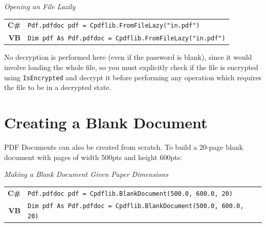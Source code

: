 \documentclass[a4paper]{memoir}
\begin{document}
\begin{framed}
\noindent\textit{Opening an File Lazily}\\

\noindent\begin{tabular}{rl}
\small\sffamily\textbf{C\#} &
\begin{minipage}{4in}
\small\verb!Pdf.pdfdoc pdf = Cpdflib.FromFileLazy("in.pdf")!
\end{minipage}\\[5mm]
\small\sffamily\textbf{VB} &
\begin{minipage}{4in}
\small\verb!Dim pdf As Pdf.pdfdoc = Cpdflib.FromFileLazy("in.pdf")!
\end{minipage}
\end{tabular}
\end{framed}

No decryption is performed here (even if the password is blank), since it would
involve loading the whole file, so you must explicitly check if the file is
encrypted using \verb!IsEncrypted! and decrypt it before performing any
operation which requires the file to be in a decrypted state.

\section{Creating a Blank Document}
PDF Documents can also be created from scratch. To build a 20-page blank document with pages of width 500pts and height 600pts:
\begin{framed}
\noindent\textit{Making a Blank Document Given Paper Dimensions}\\

\noindent\begin{tabular}{rl}
\small\sffamily\textbf{C\#} &
\begin{minipage}{4in}
\small\verb!Pdf.pdfdoc pdf = Cpdflib.BlankDocument(500.0, 600.0, 20)!
\end{minipage}\\[5mm]
\small\sffamily\textbf{VB} &
\begin{minipage}{4in}
\small\verb!Dim pdf As Pdf.pdfdoc = Cpdflib.BlankDocument(500.0, 600.0, 20)!
\end{minipage}\\[5mm]
\end{tabular}\\

\end{framed}
\end{document}
